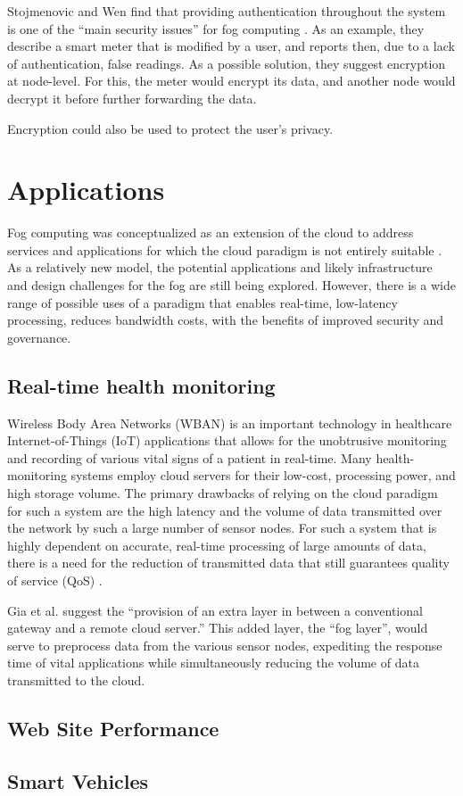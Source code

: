 \documentclass{article}
\begin{document}
Stojmenovic and Wen \cite{stojmenovic2014fog} find that providing authentication throughout the system is one of the ``main security issues'' for fog computing . As an example, they describe a smart meter that is modified by a user, and reports then, due to a lack of authentication, false readings. As a possible solution, they suggest encryption at node-level. For this, the meter would encrypt its data, and another node would decrypt it before further forwarding the data.

Encryption could also be used to protect the user's privacy.


\section{Applications}

Fog computing was conceptualized as an extension of the cloud to address services and applications for which the cloud paradigm is not entirely suitable \cite{bessis2014big}. As a relatively new model, the potential applications and likely infrastructure and design challenges for the fog are still being explored. However, there is a wide range of possible uses of a paradigm that enables real-time, low-latency processing, reduces bandwidth costs, with the benefits of improved security and governance.

\subsection{Real-time health monitoring}
Wireless Body Area Networks (WBAN) is an important technology in healthcare Internet-of-Things (IoT) applications that allows for the unobtrusive monitoring and recording of various vital signs of a patient in real-time. Many health-monitoring systems employ cloud servers for their low-cost, processing power, and high storage volume. The primary drawbacks of relying on the cloud paradigm for such a system are the high latency and the volume of data transmitted over the network by such a large number of sensor nodes. For such a system that is highly dependent on accurate, real-time processing of large amounts of data, there is a need for the reduction of transmitted data that still guarantees quality of service (QoS) \cite{gia2015fog}.

Gia et al. \cite{gia2015fog} suggest the “provision of an extra layer in between a conventional gateway and a remote cloud server.” This added layer, the “fog layer”, would serve to preprocess data from the various sensor nodes, expediting the response time of vital applications while simultaneously reducing the volume of data transmitted to the cloud.

\subsection{Web Site Performance}

\subsection{Smart Vehicles}


\renewcommand{\refname}{\section{References}}


\end{document}
